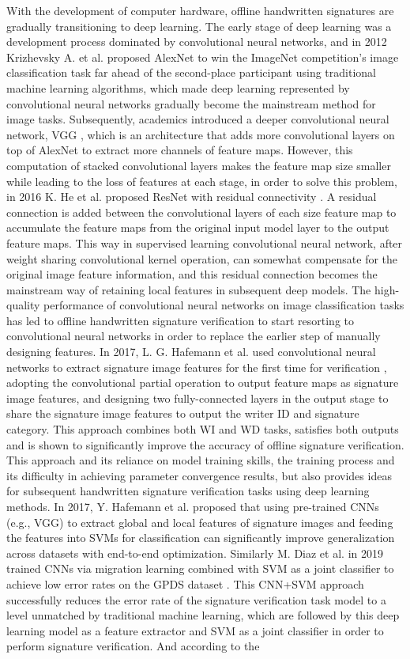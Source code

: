 With the development of computer hardware, offline handwritten signatures are gradually transitioning to deep learning. The early stage of deep learning was a development process dominated by convolutional neural networks, and in 2012 Krizhevsky A. et al. proposed AlexNet \cite{19} to win the ImageNet competition's image classification task far ahead of the second-place participant using traditional machine learning algorithms, which made deep learning represented by convolutional neural networks gradually become the mainstream method for image tasks. Subsequently, academics introduced a deeper convolutional neural network, VGG \cite{34}, which is an architecture that adds more convolutional layers on top of AlexNet to extract more channels of feature maps. However, this computation of stacked convolutional layers makes the feature map size smaller while leading to the loss of features at each stage, in order to solve this problem, in 2016 K. He et al. proposed ResNet with residual connectivity \cite{14}. A residual connection is added between the convolutional layers of each size feature map to accumulate the feature maps from the original input model layer to the output feature maps. This way in supervised learning convolutional neural network, after weight sharing convolutional kernel operation, can somewhat compensate for the original image feature information, and this residual connection becomes the mainstream way of retaining local features in subsequent deep models. The high-quality performance of convolutional neural networks on image classification tasks has led to offline handwritten signature verification to start resorting to convolutional neural networks in order to replace the earlier step of manually designing features. In 2017, L. G. Hafemann et al. used convolutional neural networks to extract signature image features for the first time for verification \cite{11}, adopting the convolutional partial operation to output feature maps as signature image features, and designing two fully-connected layers in the output stage to share the signature image features to output the writer ID and signature category. This approach combines both WI and WD tasks, satisfies both outputs and is shown to significantly improve the accuracy of offline signature verification. This approach and its reliance on model training skills, the training process and its difficulty in achieving parameter convergence results, but also provides ideas for subsequent handwritten signature verification tasks using deep learning methods. In 2017, Y. Hafemann et al. proposed that using pre-trained CNNs (e.g., VGG) to extract global and local features of signature images and feeding the features into SVMs for classification can significantly improve generalization across datasets \cite{11} with end-to-end optimization. Similarly M. Diaz et al. in 2019 trained CNNs via migration learning combined with SVM as a joint classifier to achieve low error rates on the GPDS dataset \cite{35}. This CNN+SVM approach successfully reduces the error rate of the signature verification task model to a level unmatched by traditional machine learning, which are followed by this deep learning model as a feature extractor and SVM as a joint classifier in order to perform signature verification. And according to the 